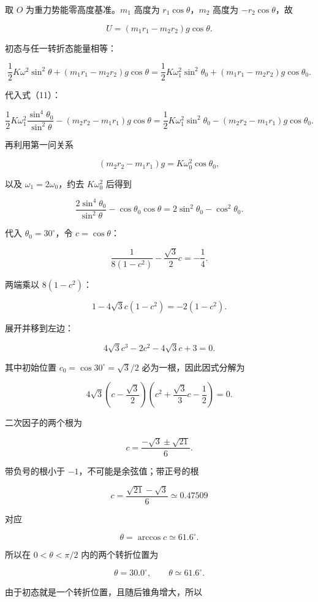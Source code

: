 \documentclass[12pt,a4paper,UTF8]{ctexart}
\begin{document}
取 \(O\) 为重力势能零高度基准。\(m_1\) 高度为 \(r_1\cos\theta\)，\(m_2\)
高度为 \(-r_2\cos\theta\)，故

\[
U=(m_1r_1-m_2r_2)g\cos\theta. \tag{13}
\]

初态与任一转折态能量相等：

\[
\frac12K\omega^2\sin^2\theta
+(m_1r_1-m_2r_2)g\cos\theta
=
\frac12K\omega_1^2\sin^2\theta_0
+(m_1r_1-m_2r_2)g\cos\theta_0. \tag{14}
\]

代入式（11）：

\[
\frac12K\omega_1^2
\frac{\sin^4\theta_0}{\sin^2\theta}
-(m_2r_2-m_1r_1)g\cos\theta
=
\frac12K\omega_1^2\sin^2\theta_0
-(m_2r_2-m_1r_1)g\cos\theta_0. \tag{15}
\]

再利用第一问关系

\[
(m_2r_2-m_1r_1)g
=K\omega_0^2\cos\theta_0, \tag{16}
\]

以及 \(\omega_1=2\omega_0\)，约去 \(K\omega_0^2\) 后得到

\[
\frac{2\sin^4\theta_0}{\sin^2\theta}
-\cos\theta_0\cos\theta
=2\sin^2\theta_0-\cos^2\theta_0. \tag{17}
\]

代入 \(\theta_0=30^\circ\)，令 \(c=\cos\theta\)：

\[
\frac{1}{8(1-c^2)}
-\frac{\sqrt3}{2}c
=-\frac14. \tag{18}
\]

两端乘以 \(8(1-c^2)\)：

\[
1-4\sqrt3c(1-c^2)=-2(1-c^2). \tag{19}
\]

展开并移到左边：

\[
4\sqrt3c^3-2c^2-4\sqrt3c+3=0. \tag{20}
\]

其中初始位置 \(c_0=\cos30^\circ=\sqrt3/2\) 必为一根，因此因式分解为

\[
4\sqrt3
\left(c-\frac{\sqrt3}{2}\right)
\left(c^2+\frac{\sqrt3}{3}c-\frac12\right)=0. \tag{21}
\]

二次因子的两个根为

\[
c=\frac{-\sqrt3\pm\sqrt{21}}{6}. \tag{22}
\]

带负号的根小于 \(-1\)，不可能是余弦值；带正号的根

\[
c=\frac{\sqrt{21}-\sqrt3}{6}
\simeq0.47509
\]

对应

\[
\theta=\arccos c\simeq61.6^\circ.
\]

所以在 \(0<\theta<\pi/2\) 内的两个转折位置为

\[
\theta=30.0^\circ,
\qquad
\theta\simeq61.6^\circ. \tag{23}
\]

由于初态就是一个转折位置，且随后锥角增大，所以
\end{document}

